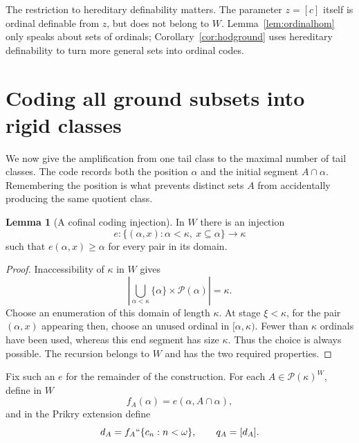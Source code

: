 \documentclass[11pt,letterpaper]{article}
\theoremstyle{definition}
\newtheorem{lemma}[definition]{Lemma}
\numberwithin{equation}{section}
\newcommand{\Pow}{\mathcal P}
\begin{document}
The restriction to hereditary definability matters. The parameter $z=[c]$ itself is ordinal definable from $z$, but does not belong to $W$. Lemma~\ref{lem:ordinalhom} only speaks about sets of ordinals; Corollary~\ref{cor:hodground} uses hereditary definability to turn more general sets into ordinal codes.

\section{Coding all ground subsets into rigid classes}\label{sec:coding}

We now give the amplification from one tail class to the maximal number of tail classes. The code records both the position $\alpha$ and the initial segment $A\cap\alpha$. Remembering the position is what prevents distinct sets $A$ from accidentally producing the same quotient class.

\begin{lemma}[A cofinal coding injection]\label{lem:encoder}
In $W$ there is an injection
\[
e:\{(\alpha,x):\alpha<\kappa,\ x\subseteq\alpha\}\longrightarrow\kappa
\]
such that $e(\alpha,x)\ge\alpha$ for every pair in its domain.
\end{lemma}
\begin{proof}
Inaccessibility of $\kappa$ in $W$ gives
\[
\left|\bigcup_{\alpha<\kappa}\{\alpha\}\times\Pow(\alpha)\right|=\kappa.
\]
Choose an enumeration of this domain of length $\kappa$. At stage $\xi<\kappa$, for the pair $(\alpha,x)$ appearing then, choose an unused ordinal in $[\alpha,\kappa)$. Fewer than $\kappa$ ordinals have been used, whereas this end segment has size $\kappa$. Thus the choice is always possible. The recursion belongs to $W$ and has the two required properties.
\end{proof}

Fix such an $e$ for the remainder of the construction. For each $A\in\Pow(\kappa)^W$, define in $W$
\begin{equation}\label{eq:fA}
f_A(\alpha)=e(\alpha,A\cap\alpha),
\end{equation}
and in the Prikry extension define
\begin{equation}\label{eq:qA}
d_A=f_A``\{c_n:n<\omega\},\qquad q_A=[d_A].
\end{equation}
\end{document}
